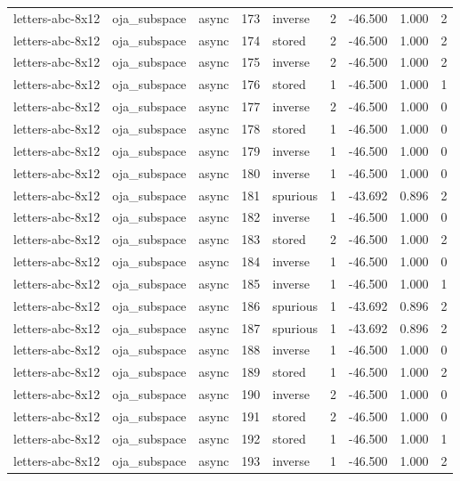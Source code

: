\begin{tabular}{lllrlrrrr}
letters-abc-8x12 & oja\_subspace & async & 173 & inverse & 2 & -46.500 & 1.000 & 2 \\
letters-abc-8x12 & oja\_subspace & async & 174 & stored & 2 & -46.500 & 1.000 & 2 \\
letters-abc-8x12 & oja\_subspace & async & 175 & inverse & 2 & -46.500 & 1.000 & 2 \\
letters-abc-8x12 & oja\_subspace & async & 176 & stored & 1 & -46.500 & 1.000 & 1 \\
letters-abc-8x12 & oja\_subspace & async & 177 & inverse & 2 & -46.500 & 1.000 & 0 \\
letters-abc-8x12 & oja\_subspace & async & 178 & stored & 1 & -46.500 & 1.000 & 0 \\
letters-abc-8x12 & oja\_subspace & async & 179 & inverse & 1 & -46.500 & 1.000 & 0 \\
letters-abc-8x12 & oja\_subspace & async & 180 & inverse & 1 & -46.500 & 1.000 & 0 \\
letters-abc-8x12 & oja\_subspace & async & 181 & spurious & 1 & -43.692 & 0.896 & 2 \\
letters-abc-8x12 & oja\_subspace & async & 182 & inverse & 1 & -46.500 & 1.000 & 0 \\
letters-abc-8x12 & oja\_subspace & async & 183 & stored & 2 & -46.500 & 1.000 & 2 \\
letters-abc-8x12 & oja\_subspace & async & 184 & inverse & 1 & -46.500 & 1.000 & 0 \\
letters-abc-8x12 & oja\_subspace & async & 185 & inverse & 1 & -46.500 & 1.000 & 1 \\
letters-abc-8x12 & oja\_subspace & async & 186 & spurious & 1 & -43.692 & 0.896 & 2 \\
letters-abc-8x12 & oja\_subspace & async & 187 & spurious & 1 & -43.692 & 0.896 & 2 \\
letters-abc-8x12 & oja\_subspace & async & 188 & inverse & 1 & -46.500 & 1.000 & 0 \\
letters-abc-8x12 & oja\_subspace & async & 189 & stored & 1 & -46.500 & 1.000 & 2 \\
letters-abc-8x12 & oja\_subspace & async & 190 & inverse & 2 & -46.500 & 1.000 & 0 \\
letters-abc-8x12 & oja\_subspace & async & 191 & stored & 2 & -46.500 & 1.000 & 0 \\
letters-abc-8x12 & oja\_subspace & async & 192 & stored & 1 & -46.500 & 1.000 & 1 \\
letters-abc-8x12 & oja\_subspace & async & 193 & inverse & 1 & -46.500 & 1.000 & 2 \\

\end{tabular}
